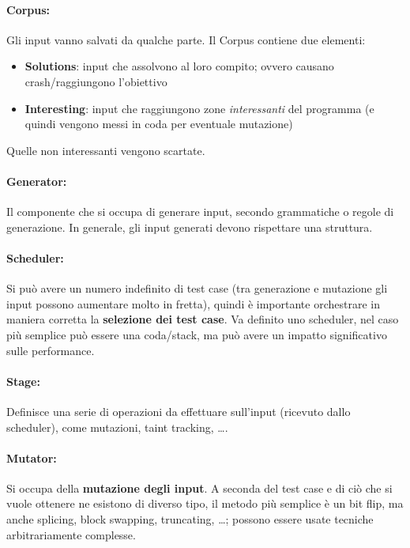 \paragraph{Corpus:} Gli input vanno salvati da qualche parte. Il Corpus contiene due elementi:
\begin{itemize}
	\item \textbf{Solutions}: input che assolvono al loro compito; ovvero causano crash/raggiungono l'obiettivo

	\item \textbf{Interesting}: input che raggiungono zone \textit{interessanti} del programma (e quindi vengono messi in coda per eventuale mutazione)
\end{itemize}
Quelle non interessanti vengono scartate.

\paragraph{Generator:} Il componente che si occupa di generare input, secondo grammatiche o regole di generazione. In generale, gli input generati devono rispettare una struttura.

\paragraph{Scheduler:} Si può avere un numero indefinito di test case (tra generazione e mutazione gli input possono aumentare molto in fretta), quindi è importante orchestrare in maniera corretta la \textbf{selezione dei test case}. Va definito uno scheduler, nel caso più semplice può essere una coda/stack, ma può avere un impatto significativo sulle performance.

\paragraph{Stage:} Definisce una serie di operazioni da effettuare sull'input (ricevuto dallo scheduler), come mutazioni, taint tracking, \dots.

\paragraph{Mutator:} Si occupa della \textbf{mutazione degli input}. A seconda del test case e di ciò che si vuole ottenere ne esistono di diverso tipo, il metodo più semplice è un bit flip, ma anche splicing, block swapping, truncating, \dots; possono essere usate tecniche arbitrariamente complesse.

